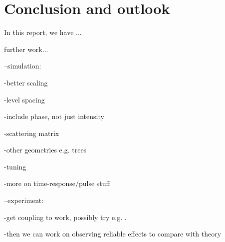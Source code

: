\chapter{Conclusion and outlook}

In this report, we have ...

further work...

--simulation:

-better scaling

-level spacing

-include phase, not just intensity

-scattering matrix

-other geometries e.g. trees

-tuning

-more on time-response/pulse stuff

--experiment:

-get coupling to work, possibly try e.g. \cite{Dietrich2018}.

-then we can work on observing reliable effects to compare with theory
